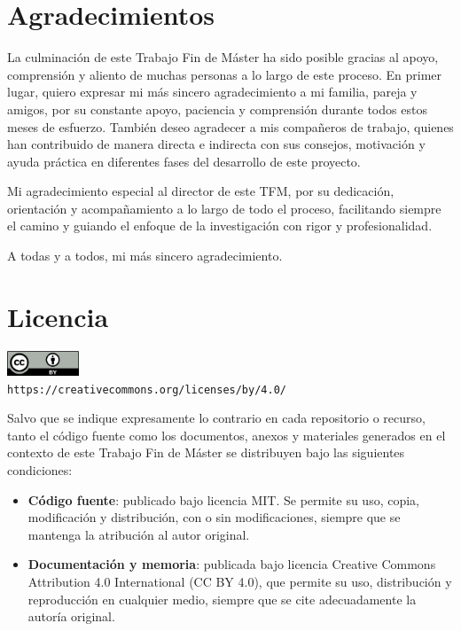 \section*{Agradecimientos}

\vspace{-0.4em}

La culminación de este Trabajo Fin de Máster ha sido posible gracias al apoyo, comprensión y aliento de muchas personas a lo largo de este proceso.  
En primer lugar, quiero expresar mi más sincero agradecimiento a mi familia, pareja y amigos, por su constante apoyo, paciencia y comprensión durante todos estos meses de esfuerzo.  
También deseo agradecer a mis compañeros de trabajo, quienes han contribuido de manera directa e indirecta con sus consejos, motivación y ayuda práctica en diferentes fases del desarrollo de este proyecto.

Mi agradecimiento especial al director de este TFM, por su dedicación, orientación y acompañamiento a lo largo de todo el proceso, facilitando siempre el camino y guiando el enfoque de la investigación con rigor y profesionalidad.

A todas y a todos, mi más sincero agradecimiento.

\section*{Licencia}

\vspace{-0.4em}

\begin{center}
	\includegraphics[width=0.16\textwidth]{includes/by.png}\\[0.5em]
	\small
	\texttt{https://creativecommons.org/licenses/by/4.0/}
\end{center}

Salvo que se indique expresamente lo contrario en cada repositorio o recurso, tanto el código fuente como los documentos, anexos y materiales generados en el contexto de este Trabajo Fin de Máster se distribuyen bajo las siguientes condiciones:

\begin{itemize}
	\item \textbf{Código fuente}: publicado bajo licencia MIT. Se permite su uso, copia, modificación y distribución, con o sin modificaciones, siempre que se mantenga la atribución al autor original.
	\item \textbf{Documentación y memoria}: publicada bajo licencia Creative Commons Attribution 4.0 International (CC BY 4.0), que permite su uso, distribución y reproducción en cualquier medio, siempre que se cite adecuadamente la autoría original.
\end{itemize}

